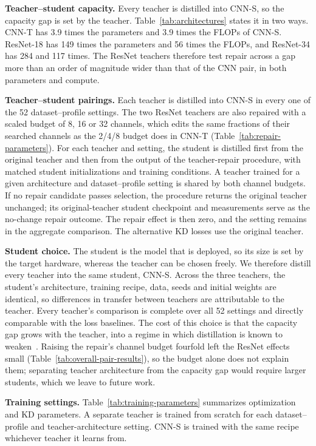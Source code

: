 \documentclass[review,number,sort&compress]{elsarticle}
\theoremstyle{definition}
\begin{document}
\textbf{Teacher--student capacity.} Every teacher is distilled into
CNN-S, so the capacity gap is set by the teacher.
Table~\ref{tab:architectures} states it in two ways. CNN-T has 3.9
times the parameters and 3.9 times the FLOPs of CNN-S. ResNet-18 has
149 times the parameters and 56 times the FLOPs, and ResNet-34 has 284
and 117 times. The ResNet teachers therefore test repair across a gap
more than an order of magnitude wider than that of the CNN pair, in
both parameters and compute.

\textbf{Teacher--student pairings.} Each teacher is distilled into
CNN-S in every one of the 52 dataset--profile settings. The two ResNet
teachers are also repaired with a scaled budget of 8, 16 or 32
channels, which edits the same fractions of their searched channels as
the 2/4/8 budget does in CNN-T (Table~\ref{tab:repair-parameters}). For
each teacher and setting, the student
is distilled first from the original teacher and then from the output
of the teacher-repair procedure, with matched student initializations
and training conditions. A teacher trained for a given architecture
and dataset--profile setting is shared by both channel budgets. If no
repair candidate passes selection, the procedure returns the original
teacher unchanged; its original-teacher student checkpoint and
measurements serve as the no-change repair outcome. The repair effect
is then zero, and the setting remains in the aggregate comparison. The
alternative KD losses use the original teacher.

\textbf{Student choice.} The student is the model that is deployed, so
its size is set by the target hardware, whereas the teacher can be
chosen freely. We therefore distill every teacher into the same
student, CNN-S. Across the three teachers, the student's architecture,
training recipe, data, seeds and initial weights are identical, so
differences in transfer between teachers are attributable to the
teacher. Every teacher's comparison is complete over all 52 settings
and directly comparable with the loss baselines. The cost of this
choice is that the capacity gap grows with the teacher, into a regime
in which distillation is known to
weaken~\citep{cho2019efficacy}. Raising the
repair's channel budget fourfold left the ResNet effects small
(Table~\ref{tab:overall-pair-results}), so the budget alone does
not explain them; separating teacher architecture from the capacity
gap would require larger students, which we leave to future work.

\textbf{Training settings.} Table~\ref{tab:training-parameters}
summarizes optimization and KD parameters. A separate teacher is
trained from scratch for each dataset--profile and teacher-architecture
setting. CNN-S is trained with the same recipe whichever teacher it
learns from.
\end{document}
